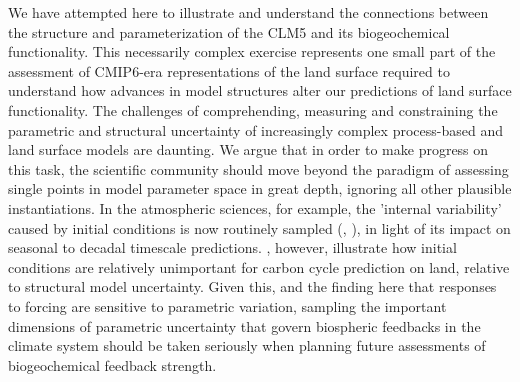 \documentclass[draft,linenumbers]{agujournal}
\begin{document}
We have attempted here to illustrate and understand the connections between the structure and parameterization of the CLM5 and its biogeochemical functionality. This necessarily complex exercise represents one small part of the assessment of CMIP6-era representations of the land surface required to understand how advances in model structures alter our predictions of land surface functionality.  The challenges of comprehending, measuring and constraining the parametric and structural uncertainty of increasingly complex process-based and land surface models are daunting. We argue that in order to make progress on this task, the scientific community should move beyond the paradigm of assessing single points in model parameter space in great depth, ignoring all other plausible instantiations. In the atmospheric  sciences, for example, the 'internal variability' caused by initial conditions is now routinely sampled (\cite{kay2015}, \cite{sanderson2018}), in light of its impact on seasonal to decadal timescale predictions. \cite{bonan2018}, however, illustrate how initial conditions are relatively unimportant for carbon cycle prediction on land, relative to structural model uncertainty. Given this,  and the finding here that responses to forcing are sensitive to parametric variation, sampling the important dimensions of parametric uncertainty that govern biospheric feedbacks in the climate system should be taken seriously when planning future assessments of biogeochemical feedback strength.
\end{document}
